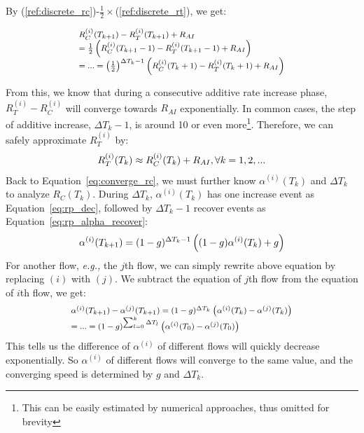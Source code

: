 By (\ref{ref:discrete_rc})-$\frac{1}{2}\times$(\ref{ref:discrete_rt}), we get:

\begin{equation}
\small
\begin{array}{l}
R_C^{(i)}(T_{k + 1}) - R_T^{(i)}(T_{k + 1}) + {R_{AI}}\\
 = \frac{1}{2}\left( {R_C^{(i)}(T_{k + 1} - 1) - R_T^{(i)}(T_{k + 1} - 1) + {R_{AI}}} \right)\\
 = ... = {\left( {\frac{1}{2}} \right)^{\Delta {T_k}-1}}\left( {R_C^{(i)}({T_k} + 1) - R_T^{(i)}({T_k} + 1) + {R_{AI}}} \right)
\end{array}
\end{equation}

From this, we know that during a consecutive additive rate increase phase, $R_T^{(i)} - R_C^{(i)}$
will converge towards $R_{AI}$ exponentially. In common cases, the step of additive increase,
$\Delta {T_k} - 1$, is around 10 or even more\footnote{This can be easily estimated by numerical approaches, 
thus omitted for brevity}. 
Therefore, we can safely approximate $R_T^{(i)}$ by:
\begin{equation}
\small
R_T^{(i)}({T_k}) \approx R_C^{(i)}({T_k}) + {R_{AI}},\forall k = 1,2,...
\end{equation}
Back to Equation~\ref{eq:converge_rc}, we must further know $\alpha ^{(i)}({T_k})$ and $\Delta T_k$ to 
analyze $R_C(T_k)$. During $\Delta T_k$, $\alpha ^{(i)}({T_k})$ has one increase event as Equation~\ref{eq:rp_dec},
followed by $\Delta T_k - 1$ recover events as Equation~\ref{eq:rp_alpha_recover}:
\begin{equation}
\small
{\alpha ^{(i)}}({T_{k + 1}}) = {(1 - g)^{\Delta {T_k} - 1}}\left( {(1 - g){\alpha ^{(i)}}({T_k}) + g} \right)
\label{eq:converge_alpha}
\end{equation}
For another flow, {\em e.g.,} the $j$th flow, we can simply rewrite above equation by replacing 
$(i)$ with $(j)$. We subtract the equation of $j$th flow from the equation of $i$th flow, we get:
\begin{equation}
\small
\begin{array}{l}
{\alpha ^{(i)}}({T_{k + 1}}) - {\alpha ^{(j)}}({T_{k + 1}}) = {(1 - g)^{\Delta {T_k}}}\left( {{\alpha ^{(i)}}({T_k}) - {\alpha ^{(j)}}({T_k})} \right)\\
 = ... = {(1 - g)^{\sum\nolimits_{l = 0}^k {\Delta {T_l}} }}\left( {{\alpha ^{(i)}}({T_0}) - {\alpha ^{(j)}}({T_0})} \right)
\end{array}
\label{eq:converge_alphaarray}
\end{equation}
This tells us the difference of $\alpha^{(i)}$ of different flows will quickly decrease exponentially. So $\alpha^{(i)}$
of different flows will converge to the same value, and the converging speed is determined by $g$ and
$\Delta T_k$. 

